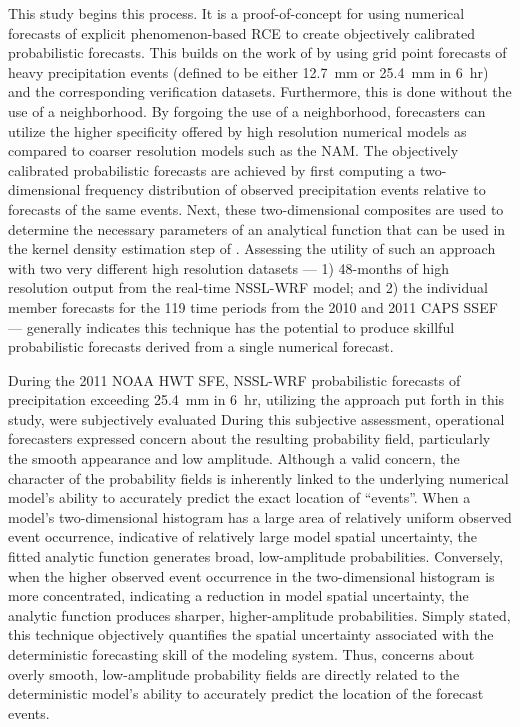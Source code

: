 This study begins this process.
It is a proof-of-concept for using numerical forecasts of explicit phenomenon-based RCE to create objectively calibrated probabilistic forecasts.
This builds on the work of \cite{Sobash2011} by using grid point forecasts of heavy precipitation events (defined to be either \mbox{12.7 mm} or \mbox{25.4 mm} in \mbox{6 hr}) and the corresponding verification datasets.
Furthermore, this is done without the use of a neighborhood.
By forgoing the use of a neighborhood, forecasters can utilize the higher specificity offered by high resolution numerical models as compared to coarser resolution models such as the NAM.
The objectively calibrated probabilistic forecasts are achieved by first computing a two-dimensional frequency distribution of observed precipitation events relative to forecasts of the same events.
Next, these two-dimensional composites are used to determine the necessary parameters of an analytical function that can be used in the kernel density estimation step of \cite{Sobash2011}.
Assessing the utility of such an approach with two very different high resolution datasets --- 1) 48-months of high resolution output from the real-time NSSL-WRF model; and 2) the individual member forecasts for the 119 time periods from the 2010 and 2011 CAPS SSEF --- generally indicates this technique has the potential to produce skillful probabilistic forecasts derived from a single numerical forecast.


During the 2011 NOAA HWT SFE, NSSL-WRF probabilistic forecasts of precipitation exceeding \mbox{25.4 mm} in \mbox{6 hr}, utilizing the approach put forth in this study, were subjectively evaluated
During this subjective assessment, operational forecasters expressed concern about the resulting probability field, particularly the smooth appearance and low amplitude.
Although a valid concern, the character of the probability fields is inherently linked to the underlying numerical model's ability to accurately predict the exact location of ``events''.
When a model's two-dimensional histogram has a large area of relatively uniform observed event occurrence, indicative of relatively large model spatial uncertainty, the fitted analytic function generates broad, low-amplitude probabilities.
Conversely, when the higher observed event occurrence in the two-dimensional histogram is more concentrated, indicating a reduction in model spatial uncertainty, the analytic function produces sharper, higher-amplitude probabilities.
Simply stated, this technique objectively quantifies the spatial uncertainty associated with the deterministic forecasting skill of the modeling system.
Thus, concerns about overly smooth, low-amplitude probability fields are directly related to the deterministic model's ability to accurately predict the location of the forecast events.


